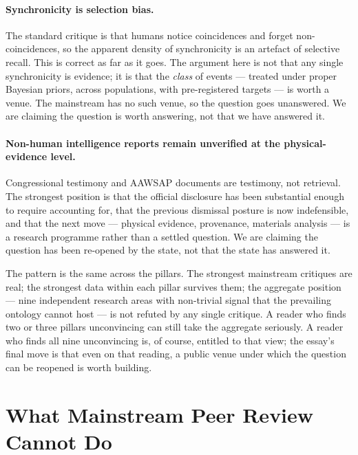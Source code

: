 \documentclass[11pt,a4paper]{article}
\begin{document}
\paragraph{Synchronicity is selection bias.} The standard critique
is that humans notice coincidences and forget non-coincidences, so
the apparent density of synchronicity is an artefact of selective
recall. This is correct as far as it goes. The argument here is
not that any single synchronicity is evidence; it is that the
\emph{class} of events --- treated under proper Bayesian priors,
across populations, with pre-registered targets --- is worth a
venue. The mainstream has no such venue, so the question goes
unanswered. We are claiming the question is worth answering, not
that we have answered it.

\paragraph{Non-human intelligence reports remain unverified at the
physical-evidence level.} Congressional testimony and AAWSAP
documents are testimony, not retrieval. The strongest position is
that the official disclosure has been substantial enough to require
accounting for, that the previous dismissal posture is now
indefensible, and that the next move --- physical evidence,
provenance, materials analysis --- is a research programme rather
than a settled question. We are claiming the question has been
re-opened by the state, not that the state has answered it.

The pattern is the same across the pillars. The strongest
mainstream critiques are real; the strongest data within each
pillar survives them; the aggregate position --- nine independent
research areas with non-trivial signal that the prevailing
ontology cannot host --- is not refuted by any single critique.
A reader who finds two or three pillars unconvincing can still
take the aggregate seriously. A reader who finds all nine
unconvincing is, of course, entitled to that view; the essay's
final move is that even on that reading, a public venue under
which the question can be reopened is worth building.

\section{What Mainstream Peer Review Cannot Do}
\end{document}
